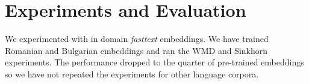 
\chapter{Experiments and Evaluation}%
\label{chap:experiments_and_evaluation}

We experimented with in domain \emph{fasttext} embeddings.
We have trained Romanian and Bulgarian embeddings and ran the WMD and Sinkhorn experiments.
The performance dropped to the quarter of pre-trained embeddings so we have not repeated the experiments for other language corpora.
